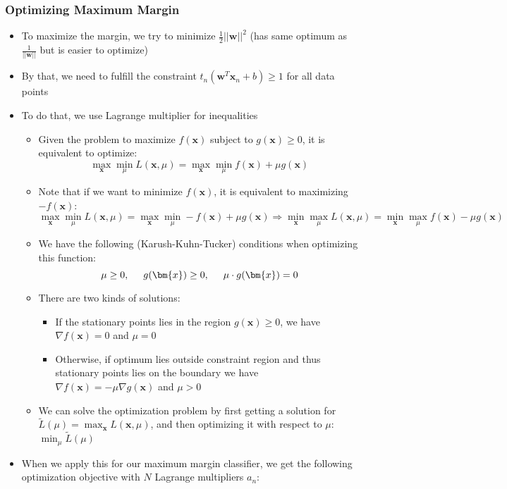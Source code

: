 \subsubsection{Optimizing Maximum Margin}
\begin{itemize}
	\item To maximize the margin, we try to minimize $\frac{1}{2}||\bm{w}||^2$ (has same optimum as $\frac{1}{||\bm{w}||}$ but is easier to optimize)
	\item By that, we need to fulfill the constraint $t_n \left(\bm{w}^T\bm{x}_n + b\right) \geq 1$ for all data points
	\item To do that, we use Lagrange multiplier for inequalities
	\begin{itemize}
		\item Given the problem to maximize $f(\bm{x})$ subject to $g(\bm{x})\geq 0$, it is equivalent to optimize:
		$$\max_{\bm{x}} \min_{\mu} L\left(\bm{x},\mu\right) = \max_{\bm{x}} \min_{\mu} f(\bm{x}) + \mu g(\bm{x})$$
		\item Note that if we want to minimize $f(\bm{x})$, it is equivalent to maximizing $-f(\bm{x})$: 
		$$\max_{\bm{x}} \min_{\mu} L\left(\bm{x},\mu\right) = \max_{\bm{x}} \min_{\mu} -f(\bm{x}) + \mu g(\bm{x}) \Rightarrow \min_{\bm{x}} \max_{\mu} L\left(\bm{x},\mu\right) = \min_{\bm{x}} \max_{\mu} f(\bm{x}) - \mu g(\bm{x})$$
		\item We have the following (Karush-Kuhn-Tucker) conditions when optimizing this function:
		$$\mu\geq0, \text{\hspace{5mm}}g(\bm{x})\geq0, \text{\hspace{5mm}}\mu\cdot g(\bm{x}) = 0$$
		\item There are two kinds of solutions:
		\begin{itemize}
			\item If the stationary points lies in the region $g(\bm{x})\geq 0$, we have $\nabla f(\bm{x})=0$ and $\mu=0$
			\item Otherwise, if optimum lies outside constraint region and thus stationary points lies on the boundary we have $\nabla f(\bm{x})=-\mu \nabla g(\bm{x})$ and $\mu > 0$
		\end{itemize}
		\item We can solve the optimization problem by first getting a solution for $\tilde{L}(\mu) = \max_{\bm{x}} L(\bm{x},\mu)$, and then optimizing it with respect to $\mu$: $\min_{\mu}\tilde{L}(\mu)$
	\end{itemize}
	\item When we apply this for our maximum margin classifier, we get the following optimization objective with $N$ Lagrange multipliers $a_n$:

\end{itemize}
